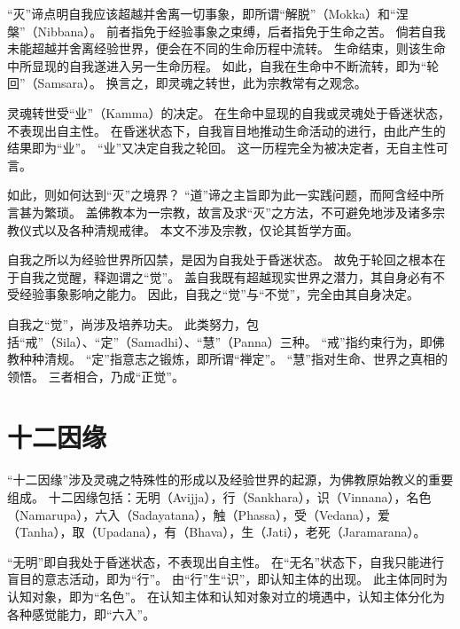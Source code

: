 \documentclass[11pt]{article}
\begin{document}
\par

“灭”谛点明自我应该超越并舍离一切事象，即所谓“解脱”（Mokka）和“涅槃”（Nibbana）。
前者指免于经验事象之束缚，后者指免于生命之苦。
倘若自我未能超越并舍离经验世界，便会在不同的生命历程中流转。
生命结束，则该生命中所显现的自我遂进入另一生命历程。
如此，自我在生命中不断流转，即为“轮回”（Samsara）。
换言之，即灵魂之转世，此为宗教常有之观念。

\par

灵魂转世受“业”（Kamma）的决定。
在生命中显现的自我或灵魂处于昏迷状态，不表现出自主性。
在昏迷状态下，自我盲目地推动生命活动的进行，由此产生的结果即为“业”。
“业”又决定自我之轮回。
这一历程完全为被决定者，无自主性可言。

\par

如此，则如何达到“灭”之境界？
“道”谛之主旨即为此一实践问题，而阿含经中所言甚为繁琐。
盖佛教本为一宗教，故言及求“灭”之方法，不可避免地涉及诸多宗教仪式以及各种清规戒律。
本文不涉及宗教，仅论其哲学方面。

\par

自我之所以为经验世界所囚禁，是因为自我处于昏迷状态。
故免于轮回之根本在于自我之觉醒，释迦谓之“觉”。
盖自我既有超越现实世界之潜力，其自身必有不受经验事象影响之能力。
因此，自我之“觉”与“不觉”，完全由其自身决定。

\par

自我之“觉”，尚涉及培养功夫。
此类努力，包括“戒”（Sila）、“定”（Samadhi）、“慧”（Panna）三种。
“戒”指约束行为，即佛教种种清规。
“定”指意志之锻炼，即所谓“禅定”。
“慧”指对生命、世界之真相的领悟。
三者相合，乃成“正觉”。

\section{十二因缘}
“十二因缘”涉及灵魂之特殊性的形成以及经验世界的起源，为佛教原始教义的重要组成。
十二因缘包括：无明（Avijja），行（Sankhara），识（Vinnana），名色（Namarupa），六入（Sadayatana），触（Phassa），受（Vedana），爱（Tanha），取（Upadana），有（Bhava），生（Jati），老死（Jaramarana）。

\par

“无明”即自我处于昏迷状态，不表现出自主性。
在“无名”状态下，自我只能进行盲目的意志活动，即为“行”。
由“行”生“识”，即认知主体的出现。
此主体同时为认知对象，即为“名色”。
在认知主体和认知对象对立的境遇中，认知主体分化为各种感觉能力，即“六入”。
\end{document}
